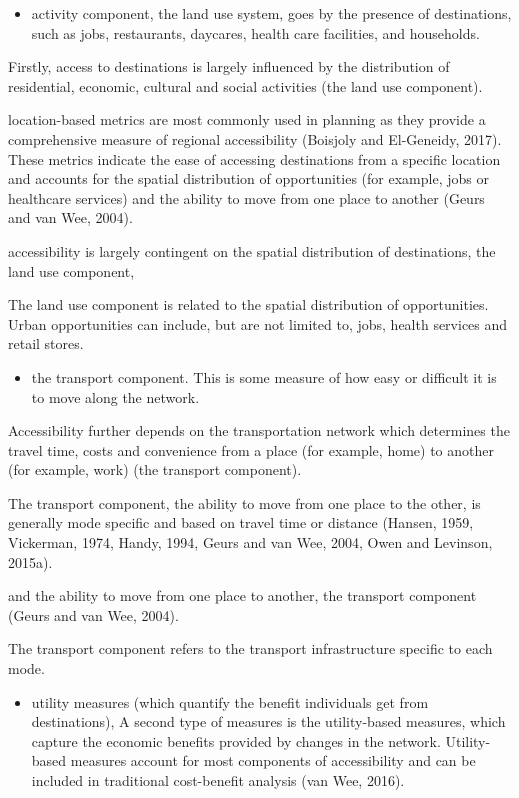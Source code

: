 \documentclass[12pt,]{article}
\providecommand{\tightlist}{%
  \setlength{\itemsep}{0pt}\setlength{\parskip}{0pt}}
\begin{document}
\begin{itemize}
\tightlist
\item
  activity component, the land use system, goes by the presence of
  destinations, such as jobs, restaurants, daycares, health care
  facilities, and households.
\end{itemize}

Firstly, access to destinations is largely influenced by the
distribution of residential, economic, cultural and social activities
(the land use component).

location-based metrics are most commonly used in planning as they
provide a comprehensive measure of regional accessibility (Boisjoly and
El-Geneidy, 2017). These metrics indicate the ease of accessing
destinations from a specific location and accounts for the spatial
distribution of opportunities (for example, jobs or healthcare services)
and the ability to move from one place to another (Geurs and van Wee,
2004).

accessibility is largely contingent on the spatial distribution of
destinations, the land use component,

The land use component is related to the spatial distribution of
opportunities. Urban opportunities can include, but are not limited to,
jobs, health services and retail stores.

\begin{itemize}
\tightlist
\item
  the transport component. This is some measure of how easy or difficult
  it is to move along the network.
\end{itemize}

Accessibility further depends on the transportation network which
determines the travel time, costs and convenience from a place (for
example, home) to another (for example, work) (the transport component).

The transport component, the ability to move from one place to the
other, is generally mode specific and based on travel time or distance
(Hansen, 1959, Vickerman, 1974, Handy, 1994, Geurs and van Wee, 2004,
Owen and Levinson, 2015a).

and the ability to move from one place to another, the transport
component (Geurs and van Wee, 2004).

The transport component refers to the transport infrastructure specific
to each mode.

\begin{itemize}
\tightlist
\item
  utility measures (which quantify the benefit individuals get from
  destinations), A second type of measures is the utility-based
  measures, which capture the economic benefits provided by changes in
  the network. Utility-based measures account for most components of
  accessibility and can be included in traditional cost-benefit analysis
  (van Wee, 2016).
\end{itemize}
\end{document}
